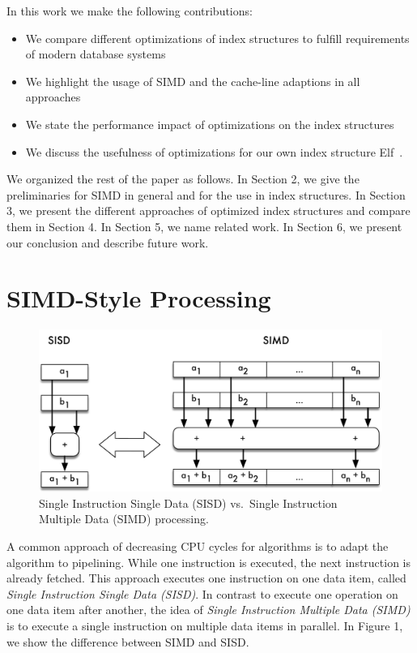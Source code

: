 \documentclass[runningheads,a4paper]{llncs}
\begin{document}
In this work we make the following contributions:
\begin{itemize}
	\item We compare different optimizations of index structures to fulfill requirements of modern database systems
	\item We highlight the usage of SIMD and the cache-line adaptions in all approaches
	\item We state the performance impact of optimizations on the index structures
	\item We discuss the usefulness of optimizations for our own index structure Elf~\cite{BKS+17}.
\end{itemize}
We organized the rest of the paper as follows. In Section 2, we give the preliminaries for SIMD in general and for the use in index structures. In Section 3, we present the different approaches of optimized index structures and compare them in Section 4. In Section 5, we name related work. In Section 6, we present our conclusion and describe future work. 
\section{SIMD-Style Processing}
\begin{figure} \vspace{-60pt}
  \begin{center}
	\includegraphics[width=.45\textwidth]{SIMD}
	\caption{Single Instruction Single Data (SISD) vs.\ Single Instruction Multiple Data (SIMD) processing.}
	\label{fig}  \end{center}
  \vspace{-20pt}
\end{figure} 
A common approach of decreasing CPU cycles for algorithms is to adapt the algorithm to pipelining. While one instruction is executed, the next instruction is already fetched. This approach executes one instruction on one data item, called \textit{Single Instruction Single Data (SISD)}. In contrast to execute one operation on one data item after another, the idea of \textit{Single Instruction Multiple Data (SIMD)} is to execute a single instruction on multiple data items in parallel. In Figure 1, we show the difference between SIMD and SISD. 
\end{document}
